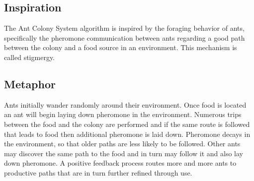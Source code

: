 \subsection{Inspiration}
The Ant Colony System algorithm is inspired by the foraging behavior of ants, specifically the pheromone communication between ants regarding a good path between the colony and a food source in an environment. This mechanism is called stigmergy.

\subsection{Metaphor}
Ants initially wander randomly around their environment. Once food is located an ant will begin laying down pheromone in the environment. Numerous trips between the food and the colony are performed and if the same route is followed that leads to food then additional pheromone is laid down. Pheromone decays in the environment, so that older paths are less likely to be followed. Other ants may discover the same path to the food and in turn may follow it and also lay down pheromone. A positive feedback process routes more and more ants to productive paths that are in turn further refined through use.

